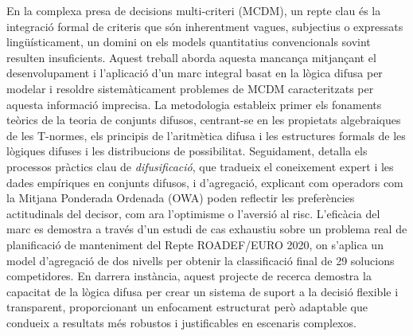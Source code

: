 \newpage
\begin{poliabstract}[Resum]
    En la complexa presa de decisions multi-criteri (MCDM), un repte clau és la integració formal de criteris que són inherentment vagues, subjectius o expressats lingüísticament, un domini on els models quantitatius convencionals sovint resulten insuficients. Aquest treball aborda aquesta mancança mitjançant el desenvolupament i l'aplicació d'un marc integral basat en la lògica difusa per modelar i resoldre sistemàticament problemes de MCDM caracteritzats per aquesta informació imprecisa. La metodologia estableix primer els fonaments teòrics de la teoria de conjunts difusos, centrant-se en les propietats algebraiques de les T-normes, els principis de l'aritmètica difusa i les estructures formals de les lògiques difuses i les distribucions de possibilitat. Seguidament, detalla els processos pràctics clau de \textit{difusificació}, que tradueix el coneixement expert i les dades empíriques en conjunts difusos, i d'agregació, explicant com operadors com la Mitjana Ponderada Ordenada (OWA) poden reflectir les preferències actitudinals del decisor, com ara l'optimisme o l'aversió al risc. L'eficàcia del marc es demostra a través d'un estudi de cas exhaustiu sobre un problema real de planificació de manteniment del Repte ROADEF/EURO 2020, on s'aplica un model d'agregació de dos nivells per obtenir la classificació final de 29 solucions competidores. En darrera instància, aquest projecte de recerca demostra la capacitat de la lògica difusa per crear un sistema de suport a la decisió flexible i transparent, proporcionant un enfocament estructurat però adaptable que condueix a resultats més robustos i justificables en escenaris complexos.
\end{poliabstract}
